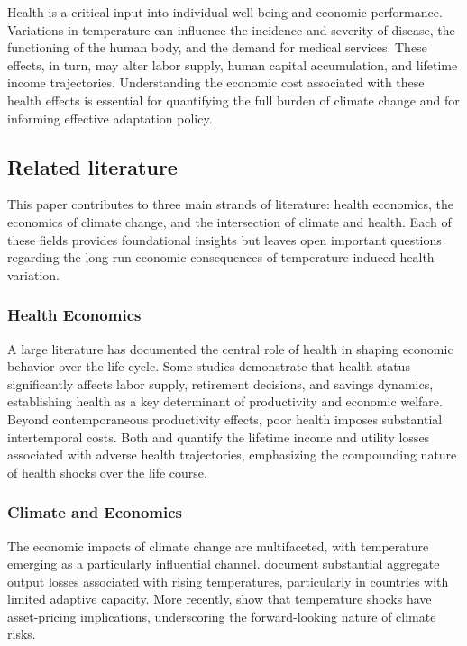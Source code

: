 \documentclass{article}
\begin{document}
Health is a critical input into individual
well-being and economic performance.
Variations in temperature can influence
the incidence and severity of disease,
the functioning of the human body, and
the demand for medical services. These
effects, in turn, may alter labor supply,
human capital accumulation, and lifetime
income trajectories. Understanding the
economic cost associated with these health
effects is essential for quantifying the
full burden of climate change and for
informing effective adaptation policy.

\subsection{Related literature}

This paper contributes to three main strands of literature: health economics, the economics of climate change, and the intersection of climate and health. Each of these fields provides foundational insights but leaves open important questions regarding the long-run economic consequences of temperature-induced health variation.

\subsubsection{Health Economics}

A large literature has documented the central role of health
in shaping economic behavior over the life cycle.
Some studies \citep{DeNardi2023} demonstrate that health status
significantly affects labor supply, retirement decisions,
and savings dynamics, establishing health as a key determinant
of productivity and economic welfare.
Beyond contemporaneous productivity effects,
poor health imposes substantial intertemporal costs.
Both \citep{DeNardi2023} and \citep{Capatina_2015} quantify
the lifetime income and utility losses associated with
adverse health trajectories, emphasizing the compounding
nature of health shocks over the life course.

\subsubsection{Climate and Economics}

The economic impacts of climate change are multifaceted, with temperature emerging as a particularly influential channel.
\citep{Burke_et_al_2015} document substantial aggregate output losses associated with rising temperatures, particularly in countries with limited adaptive capacity.
More recently, \citep{Bilal_Kanzig_2024} show that temperature shocks have asset-pricing implications, underscoring the forward-looking nature of climate risks.
\end{document}
